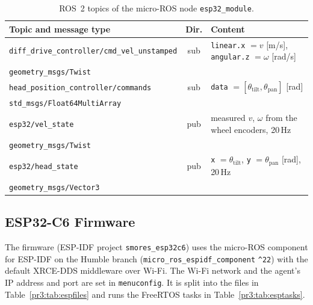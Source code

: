 \documentclass[12pt,a4paper]{article}
\begin{document}
\begin{table}[H]
\centering
\caption{ROS~2 topics of the micro-ROS node \texttt{esp32\_module}.}
\label{pr3:tab:topics}
\small
\begin{tabularx}{\linewidth}{l c >{\raggedright\arraybackslash}X}
\toprule
Topic and message type & Dir. & Content \\
\midrule
\texttt{diff\_drive\_controller/cmd\_vel\_unstamped} & sub & \texttt{linear.x} $=v$ [m/s], \texttt{angular.z} $=\omega$ [rad/s] \\
\quad\footnotesize\texttt{geometry\_msgs/Twist} & & \\[2pt]
\texttt{head\_position\_controller/commands} & sub & \texttt{data} $=[\theta_\text{tilt},\theta_\text{pan}]$ [rad] \\
\quad\footnotesize\texttt{std\_msgs/Float64MultiArray} & & \\[2pt]
\texttt{esp32/vel\_state} & pub & measured $v$, $\omega$ from the wheel encoders, 20\,Hz \\
\quad\footnotesize\texttt{geometry\_msgs/Twist} & & \\[2pt]
\texttt{esp32/head\_state} & pub & \texttt{x} $=\theta_\text{tilt}$, \texttt{y} $=\theta_\text{pan}$ [rad], 20\,Hz \\
\quad\footnotesize\texttt{geometry\_msgs/Vector3} & & \\
\bottomrule
\end{tabularx}
\end{table}

\subsection{ESP32-C6 Firmware}
\label{pr3:sec:esp}

The firmware (ESP-IDF project \texttt{smores\_esp32c6}) uses the micro-ROS component for
ESP-IDF on the Humble branch (\texttt{micro\_ros\_espidf\_component} \texttt{\^{}22}) with the
default XRCE-DDS middleware over Wi-Fi. The Wi-Fi network and the agent's IP address and
port are set in \texttt{menuconfig}. It is split into the files in Table~\ref{pr3:tab:espfiles}
and runs the FreeRTOS tasks in Table~\ref{pr3:tab:esptasks}.
\end{document}
